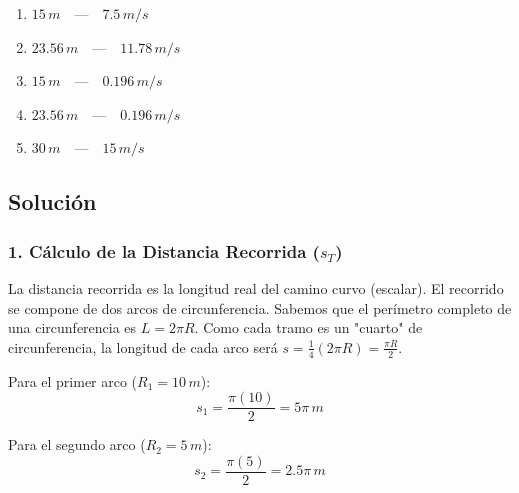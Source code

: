 \documentclass[12pt, a4paper]{article}
\begin{document}
\begin{enumerate}[label=\alph*)]
    \item $15 \, \si{m} \quad \text{---} \quad 7.5 \, \si{m/s}$
    \item $23.56 \, \si{m} \quad \text{---} \quad 11.78 \, \si{m/s}$
    \item $15 \, \si{m} \quad \text{---} \quad 0.196 \, \si{m/s}$
    \item $23.56 \, \si{m} \quad \text{---} \quad 0.196 \, \si{m/s}$
    \item $30 \, \si{m} \quad \text{---} \quad 15 \, \si{m/s}$
\end{enumerate}

\begin{center}
\end{center}

\subsection*{Solución}

\subsubsection*{1. Cálculo de la Distancia Recorrida ($s_T$)}
La distancia recorrida es la longitud real del camino curvo (escalar). El recorrido se compone de dos arcos de circunferencia.
Sabemos que el perímetro completo de una circunferencia es $L = 2\pi R$. Como cada tramo es un "cuarto" de circunferencia, la longitud de cada arco será $s = \frac{1}{4}(2\pi R) = \frac{\pi R}{2}$.

Para el primer arco ($R_1 = 10 \, \si{m}$):
$$ s_1 = \frac{\pi (10)}{2} = 5\pi \, \si{m} $$

Para el segundo arco ($R_2 = 5 \, \si{m}$):
$$ s_2 = \frac{\pi (5)}{2} = 2.5\pi \, \si{m} $$
\end{document}
